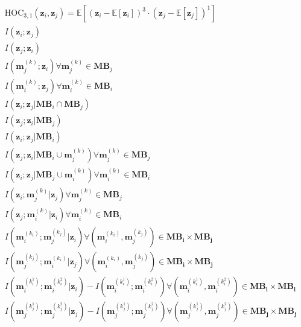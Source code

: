 \begin{table}[!h]
{\begin{minipage}{1.4\linewidth}
\begin{align}
\operatorname{HOC_{3,1}}(\mathbf{z}_i, \mathbf{z}_j) = \mathbb{E}\left[ (\mathbf{z}_i - \mathbb{E}[\mathbf{z}_i])^3 \cdot (\mathbf{z}_j - \mathbb{E}[\mathbf{z}_j])^1 \right] \label{eq:descriptor-28}\\
    I(\mathbf{z}_i ; \mathbf{z}_j) \label{eq:descriptor-08} \\
    I(\mathbf{z}_j ; \mathbf{z}_i) \label{eq:descriptor-09} \\ 
    I(\mathbf{m}_j^{(k)} ; \mathbf{z}_i) \forall \mathbf{m}_j^{(k)} \in \mathbf{MB}_j \label{eq:descriptor-10} \\
    I(\mathbf{m}_i^{(k)} ; \mathbf{z}_j) \forall \mathbf{m}_i^{(k)} \in \mathbf{MB}_i \label{eq:descriptor-11}\\
    I(\mathbf{z}_i ; \mathbf{z}_j | \mathbf{MB}_i \cap \mathbf{MB}_j) \label{eq:descriptor-03} \\
    I(\mathbf{z}_j ; \mathbf{z}_i | \mathbf{MB}_j) \label{eq:descriptor-04} \\
    I(\mathbf{z}_i ; \mathbf{z}_j | \mathbf{MB}_i) \label{eq:descriptor-05} \\
    I(\mathbf{z}_j ; \mathbf{z}_i | \mathbf{MB}_i \cup \mathbf{m}_j^{(k)}) \forall \mathbf{m}_j^{(k)} \in \mathbf{MB}_j \label{eq:descriptor-06} \\
    I(\mathbf{z}_i ; \mathbf{z}_j | \mathbf{MB}_j \cup \mathbf{m}_i^{(k)}) \forall \mathbf{m}_i^{(k)} \in \mathbf{MB}_i \label{eq:descriptor-07}\\
    I(\mathbf{z}_i ; \mathbf{m}_j^{(k)} | \mathbf{z}_j) \forall \mathbf{m}_j^{(k)} \in \mathbf{MB}_j \label{eq:descriptor-12} \\
I(\mathbf{z}_j ; \mathbf{m}_i^{(k)} | \mathbf{z}_i) \forall \mathbf{m}_i^{(k)} \in \mathbf{MB}_i \label{eq:descriptor-13} \\
    I(\mathbf{m}_i^{(k_i)} ; \mathbf{m}_j^{(k_j)} | \mathbf{z}_i) \forall (\mathbf{m}_i^{(k_i)}, \mathbf{m}_j^{(k_j)}) \in \mathbf{MB_{i}} \times \mathbf{MB_{j}} \label{eq:descriptor-14} \\
    I(\mathbf{m}_j^{(k_j)} ; \mathbf{m}_i^{(k_i)} | \mathbf{z}_j) \forall (\mathbf{m}_i^{(k_i)}, \mathbf{m}_j^{(k_j)}) \in \mathbf{MB_{i}} \times \mathbf{MB_{j}} \label{eq:descriptor-15}\\
        I(\mathbf{m}_i^{(k_{i}^{1})} ; \mathbf{m}_i^{(k_{i}^{2})} | \mathbf{z}_i) - I(\mathbf{m}_i^{(k_{i}^{1})} ; \mathbf{m}_i^{(k_{i}^{2})}) \forall (\mathbf{m}_i^{(k_{i}^{1})}, \mathbf{m}_i^{(k_{i}^{2})}) \in \mathbf{MB_{i}} \times \mathbf{MB_{i}} \label{eq:descriptor-16} \\
    I(\mathbf{m}_j^{(k_{j}^{1})} ; \mathbf{m}_j^{(k_{j}^{2})} | \mathbf{z}_j) - I(\mathbf{m}_j^{(k_{j}^{1})} ; \mathbf{m}_j^{(k_{j}^{2})}) \forall (\mathbf{m}_j^{(k_{j}^{1})}, \mathbf{m}_j^{(k_{j}^{2})}) \in \mathbf{MB_{j}} \times \mathbf{MB_{j}} \label{eq:descriptor-17}    
\end{align}
\end{minipage}
}
\caption{ }
\label{a}
\end{table}